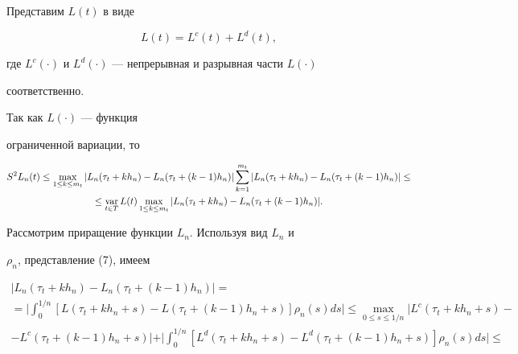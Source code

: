 \begin{pf}


Представим $L(t)$ в виде


\begin{equation}


L(t)=L^c(t)+L^d(t),


\end{equation}


где $L^c(\cdot)$ и $L^d(\cdot)$ --- непрерывная и разрывная части $L(\cdot)$


соответственно.





Так как $L(\cdot)$ --- функция


ограниченной вариации, то


\begin{gather*}


S^2L_n(t) \leq


\max\limits_{1\leq k \leq m_t}|L_n(\tau_t+kh_n)-


L_n(\tau_t+(k-1)h_n)| \sum_{k=1}^{m_t}|L_n(\tau_t+kh_n)-


L_n(\tau_t+(k-1)h_n)| \leq \\ \le \var_{t\in T} L(t)


\max\limits_{1\leq k \leq m_t}|L_n(\tau_t+kh_n)-


L_n(\tau_t+(k-1)h_n)|.


\end{gather*}





Рассмотрим приращение функции $L_n$. Используя вид $L_n$ и


$\rho_n$, представление (7), имеем


\begin{gather*}


|L_n(\tau_t+kh_n)- L_n(\tau_t+(k-1)h_n)| =\\ 


= \bigg|\int_0^{1/n} [L(\tau_t+kh_n+s)-


L(\tau_t+(k-1)h_n+s)]\rho_n(s)ds\bigg|\leq \max\limits_{0\leq s


\leq 1/n} |L^c(\tau_t+kh_n+s)-\\


- L^c(\tau_t+(k-1)h_n+s)|+


\bigg|\int_0^{1/n} [L^d(\tau_t+kh_n+s)-


L^d(\tau_t+(k-1)h_n+s)]\rho_n(s)ds\bigg|\leq\\



\end{gather*}
\end{pf}
